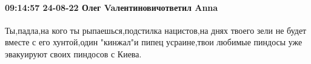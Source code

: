  
 
 
 
 

\paragraph{09:14:57 24-08-22 Олег Vaлентиновичответил Anna}

Ты,падла,на кого ты рыпаешься,подстилка нацистов,на днях твоего зели не будет
вместе с его хунтой,один "кинжал"и пипец усраине,твои любимые пиндосы уже
эвакуируют своих пиндосов с Киева.
